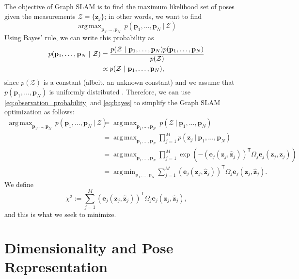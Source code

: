 \documentclass{article}
\DeclareMathOperator*{\argmax}{arg\,max}
\DeclareMathOperator*{\argmin}{arg\,min}
\newcommand{\transp}{{\scriptstyle{\mathsf{T}}}}
\begin{document}
The objective of Graph SLAM is to find the maximum likelihood set of poses given the measurements $\mathcal{Z} = \{\mathbf{z}_j\}$; in other words, we want to find 
%
\begin{equation*}
    \argmax_{\mathbf{p}_1, \ldots, \mathbf{p}_N} \ p(\mathbf{p}_1, \ldots, \mathbf{p}_N \ | \ \mathcal{Z}) 
\end{equation*}
%
Using Bayes' rule, we can write this probability as
%
\begin{align}
    p(\mathbf{p}_1, \ldots, \mathbf{p}_N \ | \ \mathcal{Z}) &= \frac{p( \mathcal{Z} \ | \ \mathbf{p}_1, \ldots, \mathbf{p}_N) p(\mathbf{p}_1, \ldots, \mathbf{p}_N) }{ p(\mathcal{Z}) } \notag \\
    &\propto p( \mathcal{Z} \ | \ \mathbf{p}_1, \ldots, \mathbf{p}_N), \label{eq:bayes}
\end{align}
%
since $p(\mathcal{Z})$ is a constant (albeit, an unknown constant) and we assume that $p(\mathbf{p}_1, \ldots, \mathbf{p}_N)$ is uniformly distributed \cite{thrun2006graph}.  Therefore, we can use \eqref{eq:observation_probability} and \eqref{eq:bayes} to simplify the Graph SLAM optimization as follows:
%
\begin{align*}
    \argmax_{\mathbf{p}_1, \ldots, \mathbf{p}_N} \ p(\mathbf{p}_1, \ldots, \mathbf{p}_N \ | \ \mathcal{Z}) &= \argmax_{\mathbf{p}_1, \ldots, \mathbf{p}_N} \ p( \mathcal{Z} \ | \ \mathbf{p}_1, \ldots, \mathbf{p}_N) \\
    &= \argmax_{\mathbf{p}_1, \ldots, \mathbf{p}_N} \prod_{j=1}^M p(\mathbf{z}_j \ | \ \mathbf{p}_1, \ldots, \mathbf{p}_N) \\
    &= \argmax_{\mathbf{p}_1, \ldots, \mathbf{p}_N} \prod_{j=1}^M \exp \left( -(\mathbf{e}_j(\mathbf{z}_j, \hat{\mathbf{z}}_j))^\transp \Omega_j \mathbf{e}_j(\mathbf{z}_j, \hat{\mathbf{z}}_j) \right) \\
    &= \argmin_{\mathbf{p}_1, \ldots, \mathbf{p}_N} \sum_{j=1}^M (\mathbf{e}_j(\mathbf{z}_j, \hat{\mathbf{z}}_j))^\transp \Omega_j \mathbf{e}_j(\mathbf{z}_j, \hat{\mathbf{z}}_j).
\end{align*}
%
We define
%
\begin{equation*}
    \chi^2 := \sum_{j=1}^M (\mathbf{e}_j(\mathbf{z}_j, \hat{\mathbf{z}}_j))^\transp \Omega_j \mathbf{e}_j(\mathbf{z}_j, \hat{\mathbf{z}}_j),
\end{equation*}
%
and this is what we seek to minimize.


\section{Dimensionality and Pose Representation}
\end{document}
